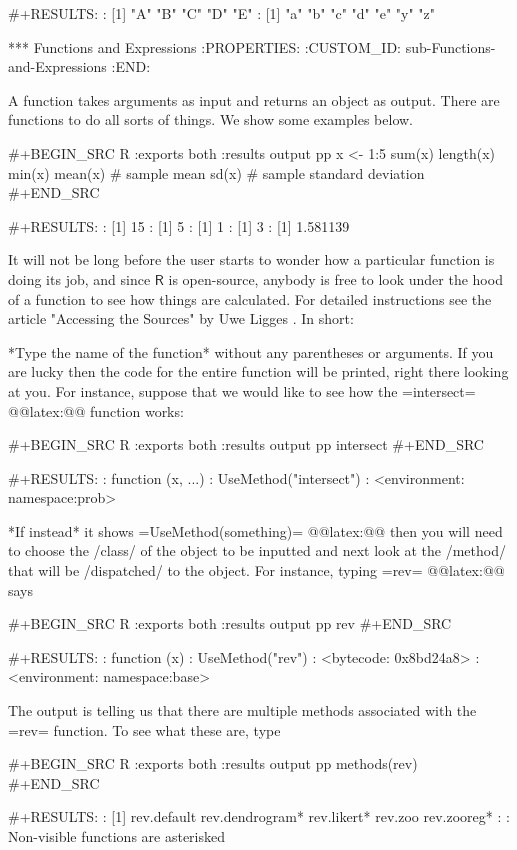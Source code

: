 #+RESULTS:
: [1] "A" "B" "C" "D" "E"
: [1] "a" "b" "c" "d" "e" "y" "z"

*** Functions and Expressions
:PROPERTIES:
:CUSTOM_ID: sub-Functions-and-Expressions
:END:

A function takes arguments as input and returns an object as
output. There are functions to do all sorts of things. We show some
examples below.

#+BEGIN_SRC R :exports both :results output pp 
x <- 1:5
sum(x)
length(x)
min(x)
mean(x)      # sample mean
sd(x)        # sample standard deviation
#+END_SRC

#+RESULTS:
: [1] 15
: [1] 5
: [1] 1
: [1] 3
: [1] 1.581139

It will not be long before the user starts to wonder how a particular
function is doing its job, and since \(\mathsf{R}\) is open-source,
anybody is free to look under the hood of a function to see how things
are calculated. For detailed instructions see the article "Accessing
the Sources" by Uwe Ligges \cite{Ligges2006}. In short:

*Type the name of the function* without any parentheses or
arguments. If you are lucky then the code for the entire function will
be printed, right there looking at you. For instance, suppose that we
would like to see how the =intersect=
@@latex:@@ function works:

#+BEGIN_SRC R :exports both :results output pp 
intersect
#+END_SRC

#+RESULTS:
: function (x, ...) 
: UseMethod("intersect")
: <environment: namespace:prob>

*If instead* it shows =UseMethod(something)=
@@latex:@@ then you will need to choose the
/class/ of the object to be inputted and next look at the /method/
that will be /dispatched/ to the object. For instance, typing =rev=
@@latex:@@ says

#+BEGIN_SRC R :exports both :results output pp 
rev
#+END_SRC

#+RESULTS:
: function (x) 
: UseMethod("rev")
: <bytecode: 0x8bd24a8>
: <environment: namespace:base>

The output is telling us that there are multiple methods associated
with the =rev= function. To see what these are, type

#+BEGIN_SRC R :exports both :results output pp 
methods(rev)
#+END_SRC

#+RESULTS:
: [1] rev.default     rev.dendrogram* rev.likert*     rev.zoo         rev.zooreg*    
: 
:    Non-visible functions are asterisked

